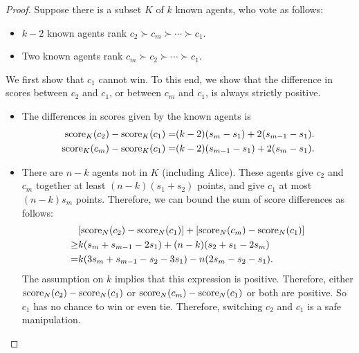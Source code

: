 \begin{proof}
Suppose there is a subset $K$ of $k$ known agents, who vote as follows:
\begin{itemize}
\item $k-2$ known agents rank $c_2 \succ c_m \succ \cdots \succ c_1$.
\item Two known agents rank $c_m \succ c_2 \succ
\cdots \succ c_1$. 
\end{itemize}
We first show that $c_1$ cannot win. To this end, we show that the difference in scores between $c_2$ and $c_1$, or between $c_m$ and $c_1$, is always strictly positive.
\begin{itemize}
\item The differences in scores given by the known agents is 
\begin{align*}
\operatorname{score}_K(c_2)-\operatorname{score}_K(c_1) =
&
(k-2)(s_m-s_1) 
+ 2(s_{m-1}-s_1).
\\
\operatorname{score}_K(c_m)-\operatorname{score}_K(c_1) =
&
(k-2)(s_{m-1}-s_1) 
+ 2(s_{m}-s_1).
\end{align*}
\item There are $n-k$ agents not in $K$ (including Alice). 
These agents give $c_2$ and $c_m$ together at least $(n-k)(s_1+s_2)$ points, and give $c_1$ at most $(n-k)s_m$ points. Therefore, we can bound the sum of score differences as follows:
\begin{align*}
&
[\operatorname{score}_N(c_2)-\operatorname{score}_N(c_1)]+[\operatorname{score}_N(c_m)-\operatorname{score}_N(c_1)] 
\\
\geq
&
k(s_m+s_{m-1}-2 s_1) 
+ 
(n-k)(s_2 + s_1 - 2 s_m)
\\
=
&
k(3 s_m + s_{m-1}-s_2 -3 s_1) 
- 
n(2 s_m - s_2 - s_1).
\end{align*}
The assumption on $k$ implies that this expression is positive. Therefore, either 
$\operatorname{score}_N(c_2)-\operatorname{score}_N(c_1)$ or $\operatorname{score}_N(c_m)-\operatorname{score}_N(c_1)$ or both are positive.
So $c_1$ has no chance to win or even tie.
Therefore, switching $c_2$ and $c_1$ is a safe manipulation.
\end{itemize}



\end{proof}
